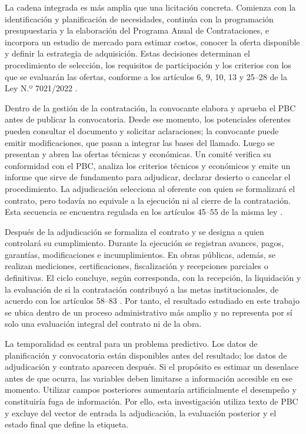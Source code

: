 La cadena integrada es más amplia que una licitación concreta. Comienza con la identificación y planificación de necesidades, continúa con la programación presupuestaria y la elaboración del Programa Anual de Contrataciones, e incorpora un estudio de mercado para estimar costos, conocer la oferta disponible y definir la estrategia de adquisición. Estas decisiones determinan el procedimiento de selección, los requisitos de participación y los criterios con los que se evaluarán las ofertas, conforme a los artículos 6, 9, 10, 13 y 25--28 de la Ley N.º 7021/2022 \parencite{ley7021paraguay}.

Dentro de la gestión de la contratación, la convocante elabora y aprueba el PBC antes de publicar la convocatoria. Desde ese momento, los potenciales oferentes pueden consultar el documento y solicitar aclaraciones; la convocante puede emitir modificaciones, que pasan a integrar las bases del llamado. Luego se presentan y abren las ofertas técnicas y económicas. Un comité verifica su conformidad con el PBC, analiza los criterios técnicos y económicos y emite un informe que sirve de fundamento para adjudicar, declarar desierto o cancelar el procedimiento. La adjudicación selecciona al oferente con quien se formalizará el contrato, pero todavía no equivale a la ejecución ni al cierre de la contratación. Esta secuencia se encuentra regulada en los artículos 45--55 de la misma ley \parencite{ley7021paraguay}.

Después de la adjudicación se formaliza el contrato y se designa a quien controlará su cumplimiento. Durante la ejecución se registran avances, pagos, garantías, modificaciones e incumplimientos. En obras públicas, además, se realizan mediciones, certificaciones, fiscalización y recepciones parciales o definitivas. El ciclo concluye, según corresponda, con la recepción, la liquidación y la evaluación de si la contratación contribuyó a las metas institucionales, de acuerdo con los artículos 58--83 \parencite{ley7021paraguay}. Por tanto, el resultado estudiado en este trabajo se ubica dentro de un proceso administrativo más amplio y no representa por sí solo una evaluación integral del contrato ni de la obra.

La temporalidad es central para un problema predictivo. Los datos de planificación y convocatoria están disponibles antes del resultado; los datos de adjudicación y contrato aparecen después. Si el propósito es estimar un desenlace antes de que ocurra, las variables deben limitarse a información accesible en ese momento. Utilizar campos posteriores aumentaría artificialmente el desempeño y constituiría fuga de información. Por ello, esta investigación utiliza texto de PBC y excluye del vector de entrada la adjudicación, la evaluación posterior y el estado final que define la etiqueta.

